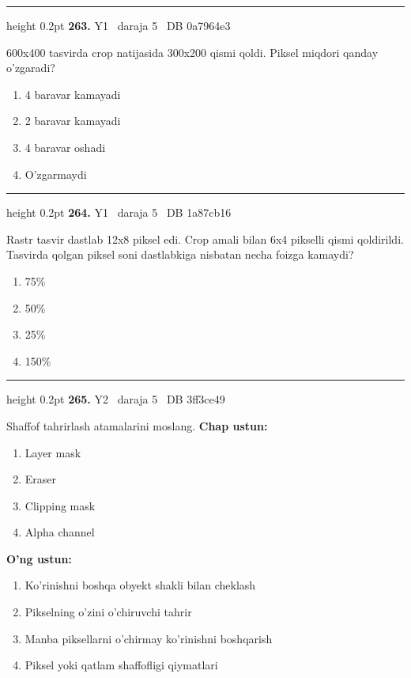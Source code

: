 \documentclass[10pt,a4paper,oneside]{article}
\begin{document}
\vspace{2mm}\hrule height 0.2pt \vspace{4mm}
\hypertarget{q263}{\textbf{\color{ink}263.}}  {\color{muted}\scriptsize Y1 \textbullet\ daraja 5 \textbullet\ DB 0a7964e3}
\par
600x400 tasvirda crop natijasida 300x200 qismi qoldi. Piksel miqdori qanday o'zgaradi?
\begin{enumerate}[label=\Alph*),leftmargin=9mm]
\item 4 baravar kamayadi
\item 2 baravar kamayadi
\item 4 baravar oshadi
\item O'zgarmaydi
\end{enumerate}
\vspace{2mm}\hrule height 0.2pt \vspace{4mm}
\hypertarget{q264}{\textbf{\color{ink}264.}}  {\color{muted}\scriptsize Y1 \textbullet\ daraja 5 \textbullet\ DB 1a87cb16}
\par
Rastr tasvir dastlab 12x8 piksel edi. Crop amali bilan 6x4 pikselli qismi qoldirildi. Tasvirda qolgan piksel soni dastlabkiga nisbatan necha foizga kamaydi?
\begin{enumerate}[label=\Alph*),leftmargin=9mm]
\item 75\%
\item 50\%
\item 25\%
\item 150\%
\end{enumerate}
\vspace{2mm}\hrule height 0.2pt \vspace{4mm}
\hypertarget{q265}{\textbf{\color{ink}265.}}  {\color{muted}\scriptsize Y2 \textbullet\ daraja 5 \textbullet\ DB 3ff3ce49}
\par
Shaffof tahrirlash atamalarini moslang.
\textbf{\footnotesize Chap ustun:}
\begin{enumerate}[label=\arabic*),leftmargin=9mm]
\item Layer mask
\item Eraser
\item Clipping mask
\item Alpha channel
\end{enumerate}
\textbf{\footnotesize O'ng ustun:}
\begin{enumerate}[label=\Alph*),leftmargin=9mm]
\item Ko'rinishni boshqa obyekt shakli bilan cheklash
\item Pikselning o'zini o'chiruvchi tahrir
\item Manba piksellarni o'chirmay ko'rinishni boshqarish
\item Piksel yoki qatlam shaffofligi qiymatlari
\end{enumerate}
\end{document}
